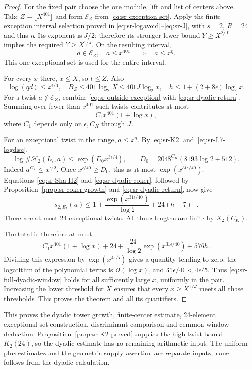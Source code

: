 \begin{proof}
For the fixed pair choose the one module, lift and list of centers
above. Take \(Z=\lfloor X^{401}\rfloor\) and form
\(\mathcal E_Z\) from \eqref{eq:sr-exception-set}.
Apply the finite-exception interval selection proved in
\eqref{eq:sr-logavoid}--\eqref{eq:sr-J}, with \(s=2\),
\(R=24\) and this \(\eta\).
Its exponent is \(J/2\); therefore its stronger lower bound
\(Y\geq X^{2/J}\) implies the required \(Y\geq X^{1/J}\).
On the resulting interval,
\[
 a\in\mathcal E_Z,\quad a\leq x^{401}
                         \quad\Longrightarrow\quad a\leq x^\eta .
\]
This one exceptional set is used for the entire interval.

For every \(x\) there, \(x\leq X\), so \(t\leq Z\).
Also
\[
 \log(qd)\leq x^{\epsilon/4},\quad
 B_Z\leq401\log_2 X\leq401J\log_2 x,\quad
 h\leq1+(2+8\epsilon)\log_2 x.
\]
For a twist \(a\notin\mathcal E_Z\), combine
\eqref{eq:sr-outside-exception} with
\eqref{eq:sr-dyadic-return}.
Summing over fewer than \(x^{401}\) such twists contributes at most
\[
                     C_1 x^{401}(1+\log x),
\]
where \(C_1\) depends only on \(\epsilon,C_K\) through \(J\).

For an exceptional twist in the range, \(a\leq x^\eta\).
By \eqref{eq:sr-K2} and~\eqref{eq:sr-L7-logdisc},
\[
 \log\#\mathcal H_2(L_7,a)
 \leq\exp(D_0x^{3\epsilon/4}),\qquad
 D_0=2048^{C_K}(8193\log2+512).
\]
Indeed \(a^{C_K}\leq x^{\epsilon/2}\).
Once \(x^{\epsilon/40}\geq D_0\), this is at most
\(\exp(x^{31\epsilon/40})\).
Equations~\eqref{eq:sr-Sha-H2} and
\eqref{eq:sr-dyadic-coker}, followed by
Proposition~\ref{prop:sr-coker-growth} and
\eqref{eq:sr-dyadic-return}, now give
\[
 s_{2,E_h}(a)
 \leq1+\frac{\exp(x^{31\epsilon/40})}{\log2}
                          +24(h-7)_+ .
\]
There are at most 24 exceptional twists.
All these lengths are finite by \(K_2(C_K)\).

The total is therefore at most
\[
 C_1x^{401}(1+\log x)
 +24+\frac{24}{\log2}\exp(x^{31\epsilon/40})
                              +576h .
\]
Dividing this expression by \(\exp(x^{4\epsilon/5})\) gives a
quantity tending to zero:
the logarithm of the polynomial terms is \(O(\log x)\), and
\(31\epsilon/40<4\epsilon/5\).
Thus \eqref{eq:sr-full-dyadic-window} holds for all sufficiently
large \(x\), uniformly in the pair.
Increasing the lower threshold for \(X\) ensures that every
\(x\geq X^{1/J}\) meets all those thresholds.
This proves the theorem and all its quantifiers.
\end{proof}

This proves the dyadic tower growth, finite-center estimate,
24-element exceptional-set construction, discriminant comparison
and common-window deduction.
Proposition~\ref{prop:sr-K2-proved} supplies the high-twist bound
\(K_2(24)\), so the dyadic estimate has no remaining arithmetic input.
The uniform plus estimates and the geometric supply assertion
are separate inputs; none follows from the dyadic calculation.


